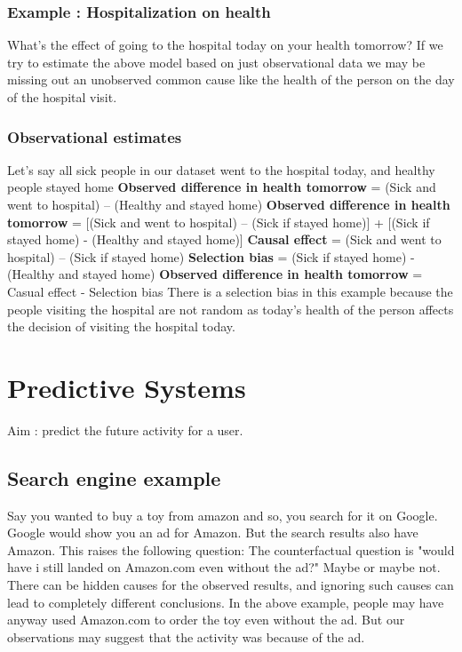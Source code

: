 \subsubsection{Example : Hospitalization on health}
What's the effect of going to the hospital today on your health tomorrow?
If we try to estimate the above model based on just observational data we may be missing out an unobserved common cause like the health of the person on the day of the hospital visit.

\subsubsection*{Observational estimates}
Let’s say all sick people in our dataset went to the hospital today, and healthy people stayed home \newline
\textbf {Observed difference in health tomorrow}  = (Sick and went to hospital) – (Healthy and stayed home) \newline
\textbf {Observed difference in health tomorrow} = [(Sick and went to hospital) – (Sick if stayed home)] + [(Sick if stayed home) - (Healthy and stayed home)] \newline
\textbf{Causal effect} = (Sick and went to hospital) – (Sick if stayed home) \newline
\textbf {Selection bias} = (Sick if stayed home) - (Healthy and stayed home) \newline
\textbf {Observed difference in health tomorrow} = Casual effect - Selection bias \newline
There is a selection bias in this example because the people visiting the hospital are not random as today's health of the person affects the decision of visiting the hospital today.

\section{Predictive Systems}
Aim : predict the future activity for a user.

\subsection{Search engine example}
Say you wanted to buy a toy from amazon and so, you search for it on Google. Google would show you an ad for Amazon. \newline
But the search results also have Amazon. This raises the following question: \newline
The counterfactual question is "would have i still landed on Amazon.com even without the ad?" \newline
Maybe or maybe not.\newline
There can be hidden causes for the observed results, and ignoring such causes can lead to completely different conclusions. \newline
In the above example, people may have anyway used Amazon.com to order the toy even without the ad. But our observations may suggest that the activity was because of the ad.

